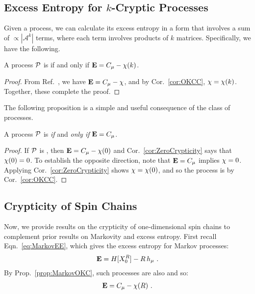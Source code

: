 \subsection{Excess Entropy for $k$-Cryptic Processes}

Given a  process, we can calculate its excess entropy in a form
that involves a sum of $\propto |\mathcal{A}^k|$ terms, where each term
involves products of $k$ matrices. Specifically, we have the following.

\begin{Cor}
A process $\mathcal{P}$ is  if and only if ${\bf E} = C_\mu - \chi(k)$.
\label{cor:OKCE}
\end{Cor}

\begin{proof}
From Ref.~\cite{Crut08a}, we have ${\bf E} = C_\mu - \chi$, and by Cor.~\ref{cor:OKCC},
$\chi = \chi(k)$. Together, these complete the proof.
\end{proof}

The following proposition is a simple and useful consequence of the class
of  processes.

\begin{Cor}
A process $\mathcal{P}$ is  \emph{if} and \emph{only if} ${\bf E} = C_\mu$.
\label{cor:EEEqualCmu}
\end{Cor}

\begin{proof}
If $\mathcal{P}$ is , then ${\bf E} = C_\mu - \chi(0)$ and Cor.~\ref{cor:ZeroCrypticity}
says that $\chi(0)=0$. To establish the opposite direction, note that ${\bf E} = C_\mu$ implies $\chi=0$.
Applying Cor.~\ref{cor:ZeroCrypticity} shows $\chi = \chi(0)$, and so the process is
 by Cor.~\ref{cor:OKCC}.
\end{proof}

\subsection{Crypticity of Spin Chains}
Now, we provide results on the crypticity of one-dimensional spin chains 
to complement prior results on Markovity and excess entropy.  First recall 
Eqn.~\ref{eq:MarkovEE}, which gives the excess entropy for  Markov 
processes:
\begin{align*}
{\bf E} = H[X_0^R] - R \, h_\mu ~.
\end{align*}
By Prop.~\ref{prop:MarkovOKC}, such processes are also  and so:
\begin{align*}
{\bf E} = C_\mu - \chi(R) ~.
\end{align*}

